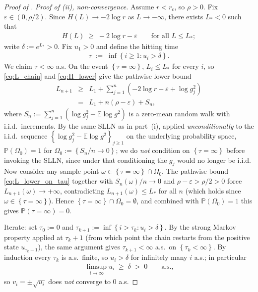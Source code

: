 \documentclass[10pt,a4paper]{amsart}
\newcommand{\Brack}[1]{\left( #1 \right)}
\newcommand{\Exp}[1]{\mathbb{E} #1}
\newcommand{\Prob}[1]{\mathbb{P}\left( #1 \right)}
\newcommand{\Set}[1]{\left\{ #1 \right\}}
\newcommand{\eps}{\varepsilon}
\begin{document}
\begin{proof}[Proof of ]
  \emph{Proof of (ii), non-convergence.} Assume $r < r_c$, so $\rho > 0$. Fix $\eps \in (0, \rho/2)$. Since $H(L) \to -2\log r$ as $L \to -\infty$, there exists $L_* < 0$ such that
  \begin{eqnarray}
    \label{eq:H_lower}
    H(L) \;\ge\; -2\log r - \eps \qquad \text{for all } L \le L_*;
  \end{eqnarray}
  write $\delta := e^{L_*} > 0$. Fix $u_1 > 0$ and define the hitting time
  \begin{eqnarray*}
    \tau \;:=\; \inf\Set{i \ge 1 : u_i > \delta}.
  \end{eqnarray*}
  We claim $\tau < \infty$ a.s. On the event $\Set{\tau = \infty}$, $L_i \le L_*$ for every $i$, so \eqref{eq:L_chain} and \eqref{eq:H_lower} give the pathwise lower bound
  \begin{eqnarray}
    \label{eq:L_lower_on_tau}
    L_{n+1} & \ge & L_1 + \sum_{j=1}^n\Brack{-2\log r - \eps + \log g_j^2} \nonumber \\
    & = & L_1 + n\Brack{\rho - \eps} + S_n,
  \end{eqnarray}
  where $S_n := \sum_{j=1}^n(\log g_j^2 - \Exp{\log g^2})$ is a zero-mean random walk with i.i.d.\ increments. By the same SLLN as in part~(i), applied \emph{unconditionally} to the i.i.d.\ sequence $\Set{\log g_j^2 - \Exp{\log g^2}}_{j \ge 1}$ on the underlying probability space, $\Prob{\Omega_0} = 1$ for $\Omega_0 := \Set{S_n/n \to 0}$; we do \emph{not} condition on $\Set{\tau = \infty}$ before invoking the SLLN, since under that conditioning the $g_j$ would no longer be i.i.d. Now consider any sample point $\omega \in \Set{\tau = \infty} \cap \Omega_0$. The pathwise bound \eqref{eq:L_lower_on_tau} together with $S_n(\omega)/n \to 0$ and $\rho - \eps > \rho/2 > 0$ force $L_{n+1}(\omega) \to +\infty$, contradicting $L_{n+1}(\omega) \le L_*$ for all $n$ (which holds since $\omega \in \Set{\tau = \infty}$). Hence $\Set{\tau = \infty} \cap \Omega_0 = \emptyset$, and combined with $\Prob{\Omega_0} = 1$ this gives $\Prob{\tau = \infty} = 0$.

  Iterate: set $\tau_0 := 0$ and $\tau_{k+1} := \inf\Set{i > \tau_k : u_i > \delta}$. By the strong Markov property applied at $\tau_k + 1$ (from which point the chain restarts from the positive state $u_{\tau_k + 1}$), the same argument gives $\tau_{k+1} < \infty$ a.s.\ on $\Set{\tau_k < \infty}$. By induction every $\tau_k$ is a.s.\ finite, so $u_i > \delta$ for infinitely many $i$ a.s.; in particular
  \begin{eqnarray*}
    \limsup_{i\to\infty} u_i \;\ge\; \delta \;>\; 0 \qquad \text{a.s.,}
  \end{eqnarray*}
  so $v_i = \pm\sqrt{u_i}$ does \emph{not} converge to $0$ a.s.


\end{proof}
\end{document}
